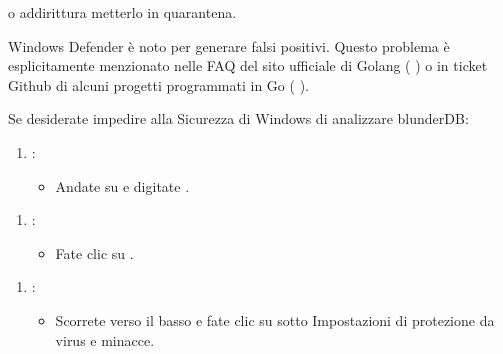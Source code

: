 \documentclass[letterpaper,10pt,italian]{sphinxmanual}
\begin{document}
\begin{figure}[htbp]
\centering

\noindent{}
\end{figure}

\sphinxAtStartPar
o addirittura metterlo in quarantena.

\sphinxAtStartPar
Windows Defender è noto per generare falsi positivi. Questo problema è esplicitamente menzionato nelle FAQ del sito ufficiale di Golang (  ) o in ticket Github di alcuni progetti programmati in Go (  ).

\sphinxAtStartPar
Se desiderate impedire alla Sicurezza di Windows di analizzare blunderDB:
\begin{enumerate}
%
\item {} 
\sphinxAtStartPar
{}:
\begin{itemize}
\item {} 
\sphinxAtStartPar
Andate su  e digitate .

\end{itemize}

\end{enumerate}

\begin{figure}[htbp]
\centering

\noindent{}
\end{figure}
\begin{enumerate}
%
\setcounter{enumi}{1}
\item {} 
\sphinxAtStartPar
{}:
\begin{itemize}
\item {} 
\sphinxAtStartPar
Fate clic su .

\end{itemize}

\end{enumerate}

\begin{figure}[htbp]
\centering

\noindent{}
\end{figure}
\begin{enumerate}
%
\setcounter{enumi}{2}
\item {} 
\sphinxAtStartPar
{}:
\begin{itemize}
\item {} 
\sphinxAtStartPar
Scorrete verso il basso e fate clic su  sotto Impostazioni di protezione da virus e minacce.

\end{itemize}

\end{enumerate}
\end{document}

